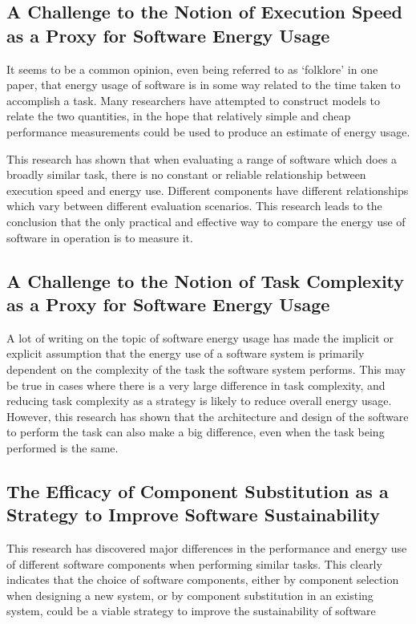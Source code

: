 \subsection{A Challenge to the Notion of Execution Speed as a Proxy for Software Energy Usage}
\label{contrib:speed as proxy}

It seems to be a common opinion, even being referred to as `folklore' in one paper, that energy usage of software is in some way related to the time taken to accomplish a task. Many researchers have attempted to construct models to relate the two quantities, in the hope that relatively simple and cheap performance measurements could be used to produce an estimate of energy usage.

This research has shown that when evaluating a range of software which does a broadly similar task, there is no constant or reliable relationship between execution speed and energy use. Different components have different relationships which vary between different evaluation scenarios. This research leads to the conclusion that the only practical and effective way to compare the energy use of software in operation is to measure it.

\subsection{A Challenge to the Notion of Task Complexity as a Proxy for Software Energy Usage}
\label{contrib:complexity as proxy}

A lot of writing on the topic of software energy usage has made the implicit or explicit assumption that the energy use of a software system is primarily dependent on the complexity of the task the software system performs. This may be true in cases where there is a very large difference in task complexity, and reducing task complexity as a strategy is likely to reduce overall energy usage. However, this research has shown that the architecture and design of the software to perform the task can also make a big difference, even when the task being performed is the same.

\subsection{The Efficacy of Component Substitution as a Strategy to Improve Software Sustainability}
\label{contrib:efficacy}

This research has discovered major differences in the performance and energy use of different software components when performing similar tasks. This clearly indicates that the choice of software components, either by component selection when designing a new system, or by component substitution in an existing system, could be a viable strategy to improve the sustainability of software 

